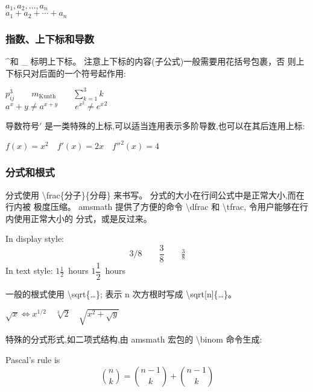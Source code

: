 \documentclass[a4paper]{ctexart}
\begin{document}
    $a_1,a_2,\dots,a_n$\\
    $a_1 + a_2 + \cdots + a_n$\par
    \subsubsection{指数、上下标和导数}
    \textasciicircum 和 \_ 标明上下标。%
    注意上下标的内容(子公式)一般需要用花括号包裹，否 则上下标只对后面的一个符号起作用:\par
    $p^3_{ij} \qquad
     m_\mathrm{Kunth} \qquad
     \sum_{k=1}^3 k$\\
    $a^x +y \neq a^{x+y} \qquad
     e^{x^2} \neq {e^x}^2$ \par
    导数符号$'$ 是一类特殊的上标,可以适当连用表示多阶导数,也可以在其后连用上标:\par
    $f(x) = x^2 \quad
     f'(x) = 2x \quad
     f''^{2}(x) = 4$ \par
    \subsubsection{分式和根式}
    分式使用 \textbackslash frac\{分子\}\{分母\} 来书写。%
    分式的大小在行间公式中是正常大小,而在行内被 极度压缩。%
    amsmath 提供了方便的命令 \textbackslash dfrac 和 \textbackslash tfrac,%
    令用户能够在行内使用正常大小的 分式，或是反过来。\par
    In display style:
    \[
        3/8 \qquad
        \frac{3}{8} \qquad
        \tfrac{3}{8}
    \]
    In text style:
    $1\frac{1}{2}$~hours \qquad
    $1\dfrac{1}{2}$~hours\par
    一般的根式使用 \textbackslash sqrt\{\dots\};%
    表示 n 次方根时写成 \textbackslash sqrt[n]\{\dots\}。\par
    $\sqrt{x} \Leftrightarrow x^{1/2} \quad
     \sqrt[3]{2} \quad
     \sqrt{x^{2} + \sqrt{y}}$ \par
    特殊的分式形式,如二项式结构,由 amsmath 宏包的 \textbackslash binom 命令生成:\par
    Pascal's rule is
    \[
        \binom{n}{k} = \binom{n - 1}{k} + \binom{n - 1}{k}   
    \]
\end{document}
